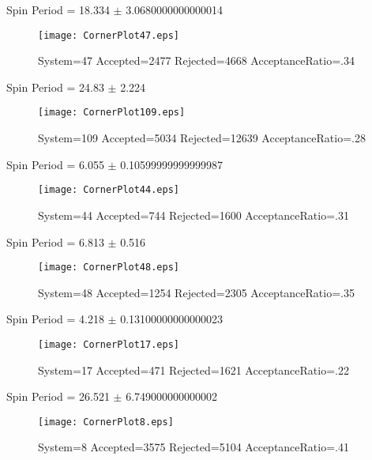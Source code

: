 \documentclass[10pt]{article}
\begin{document}
\newpage
\begin{center}
        Spin Period = 18.334 $\pm$ 3.0680000000000014
        \end{center}
\begin{figure}[H] 
        \texttt{[image: CornerPlot47.eps]}
        \caption{System=47 Accepted=2477 Rejected=4668 AcceptanceRatio=.34}
        \label{S47}
        \centering
        \end{figure}
\newpage
\begin{center}
        Spin Period = 24.83 $\pm$ 2.224
        \end{center}
\begin{figure}[H] 
        \texttt{[image: CornerPlot109.eps]}
        \caption{System=109 Accepted=5034 Rejected=12639 AcceptanceRatio=.28}
        \label{S109}
        \centering
        \end{figure}
\newpage
\begin{center}
        Spin Period = 6.055 $\pm$ 0.10599999999999987
        \end{center}
\begin{figure}[H] 
        \texttt{[image: CornerPlot44.eps]}
        \caption{System=44 Accepted=744 Rejected=1600 AcceptanceRatio=.31}
        \label{S44}
        \centering
        \end{figure}
\newpage
\begin{center}
        Spin Period = 6.813 $\pm$ 0.516
        \end{center}
\begin{figure}[H] 
        \texttt{[image: CornerPlot48.eps]}
        \caption{System=48 Accepted=1254 Rejected=2305 AcceptanceRatio=.35}
        \label{S48}
        \centering
        \end{figure}
\newpage
\begin{center}
        Spin Period = 4.218 $\pm$ 0.13100000000000023
        \end{center}
\begin{figure}[H] 
        \texttt{[image: CornerPlot17.eps]}
        \caption{System=17 Accepted=471 Rejected=1621 AcceptanceRatio=.22}
        \label{S17}
        \centering
        \end{figure}
\newpage
\begin{center}
        Spin Period = 26.521 $\pm$ 6.749000000000002
        \end{center}
\begin{figure}[H] 
        \texttt{[image: CornerPlot8.eps]}
        \caption{System=8 Accepted=3575 Rejected=5104 AcceptanceRatio=.41}
        \label{S8}
        \centering
        \end{figure}
\end{document}
